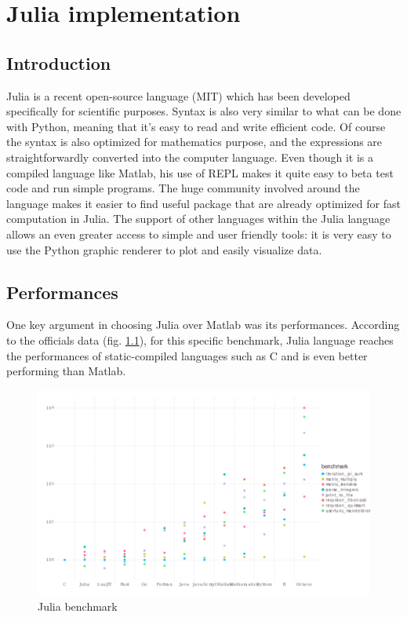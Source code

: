 
\chapter{Julia implementation}
\label{chap:julia}

\section{Introduction}

Julia is a recent open-source language (MIT) which has been developed specifically for scientific purposes. Syntax is also very similar to what can be done with Python, meaning that it's easy to read and write efficient code. Of course the syntax is also optimized for mathematics purpose, and the expressions are straightforwardly converted into the computer language. Even though it is a compiled language like Matlab, his use of REPL makes it quite easy to beta test code and run simple programs. The huge community involved around the language makes it easier to find useful package that are already optimized for fast computation in Julia. The support of other languages within the Julia language allows an even greater access to simple and user friendly tools: it is very easy to use the Python graphic renderer to plot and easily visualize data.

\section{Performances}

One key argument in choosing Julia over Matlab was its performances. According to the officials data (fig. \ref{fig:7}), for this specific benchmark, Julia language reaches the performances of static-compiled languages such as C and is even better performing than Matlab.

\begin{figure}
    \centering
    \includegraphics*[width=.6\paperwidth]{figures/benchmarks.png}
    \caption{Julia benchmark \label{fig:7}}
\end{figure}

